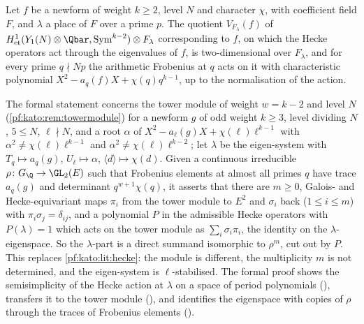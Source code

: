 \begin{littheorem}\label{pf:kato:lit:hecke}
Let $f$ be a newform of weight $k\ge2$, level $N$ and character $\chi$, with coefficient field $F$, and $\lambda$ a place of $F$ over a prime $p$.
The quotient $V_{F_\lambda}(f)$ of $H^1_{\mathrm{et}}(Y_1(N)\otimes\Qbar,\mathrm{Sym}^{k-2})\otimes F_\lambda$ corresponding to $f$, on which
the Hecke operators act through the eigenvalues of $f$, is two-dimensional over $F_\lambda$, and for every prime $q\nmid Np$ the arithmetic Frobenius at $q$ acts on it with
characteristic polynomial $X^2-a_q(f)X+\chi(q)q^{k-1}$, up to the normalisation of the action.
\end{littheorem}

\begin{remark}\label{pf:kato:rem:hecke}
The formal statement concerns the tower module of weight $w=k-2$ and level $N$ (\cref{pf:kato:rem:towermodule}) for a newform $g$ of odd
weight $k\ge3$, level dividing $N$, $5\le N$, $\ell\nmid N$, and a root $\alpha$ of $X^2-a_\ell(g)X+\chi(\ell)\ell^{k-1}$ with
$\alpha^2\ne\chi(\ell)\ell^{k-1}$ and $\alpha^2\ne\chi(\ell)\ell^{k-2}$; let $\lambda$ be the eigen-system with $T_q\mapsto a_q(g)$, $U_\ell\mapsto\alpha$,
$\langle d\rangle\mapsto\chi(d)$. Given a continuous irreducible $\rho\colon G_\Q\to\GL_2(E)$ such that Frobenius elements at almost all
primes $q$ have trace $a_q(g)$ and determinant $q^{w+1}\chi(q)$, it asserts that there are $m\ge0$, Galois- and Hecke-equivariant maps
$\pi_i$ from the tower module to $E^2$ and $\sigma_i$ back ($1\le i\le m$) with $\pi_i\sigma_j=\delta_{ij}$, and a polynomial $P$ in the admissible
Hecke operators with $P(\lambda)=1$ which acts on the tower module as $\sum_i\sigma_i\pi_i$, the identity on the $\lambda$-eigenspace. So the
$\lambda$-part is a direct summand isomorphic to $\rho^m$, cut out by $P$. This replaces \cref{pf:kato:lit:hecke}: the module is different, the
multiplicity $m$ is not determined, and the eigen-system is $\ell$-stabilised. The formal proof shows the semisimplicity of the Hecke action
at $\lambda$ on a space of period polynomials (), transfers it to the
tower module (), and identifies the eigenspace with copies of $\rho$
through the traces of Frobenius elements ().
\end{remark}

